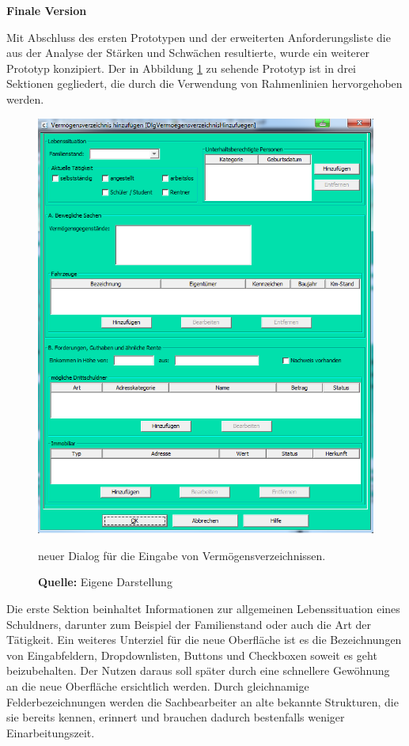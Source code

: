 \textbf{Finale Version}

Mit Abschluss des ersten Prototypen und der erweiterten Anforderungsliste die aus der Analyse der Stärken und Schwächen resultierte, wurde ein weiterer Prototyp konzipiert. Der in Abbildung \ref{fig:neuerDialog} zu sehende Prototyp ist in drei Sektionen gegliedert, die durch die Verwendung von Rahmenlinien hervorgehoben werden. 
\begin{figure}[H]
  \centering
  \includegraphics[scale=0.85]{img/neuer_Dialog.PNG}
  \caption{neuer Dialog für die Eingabe von Vermögensverzeichnissen.}
    \caption*{\textbf{Quelle:} Eigene Darstellung}
  \label{fig:neuerDialog}
\end{figure}
Die erste Sektion beinhaltet Informationen zur allgemeinen Lebenssituation eines Schuldners, darunter zum Beispiel der Familienstand oder auch die Art der Tätigkeit. Ein weiteres Unterziel für die neue Oberfläche ist es die Bezeichnungen von Eingabfeldern, Dropdownlisten, Buttons und Checkboxen soweit es geht beizubehalten. Der Nutzen daraus soll später durch eine schnellere Gewöhnung an die neue Oberfläche ersichtlich werden. Durch gleichnamige Felderbezeichnungen werden die Sachbearbeiter an alte bekannte Strukturen, die sie bereits kennen, erinnert und brauchen dadurch bestenfalls weniger Einarbeitungszeit.

